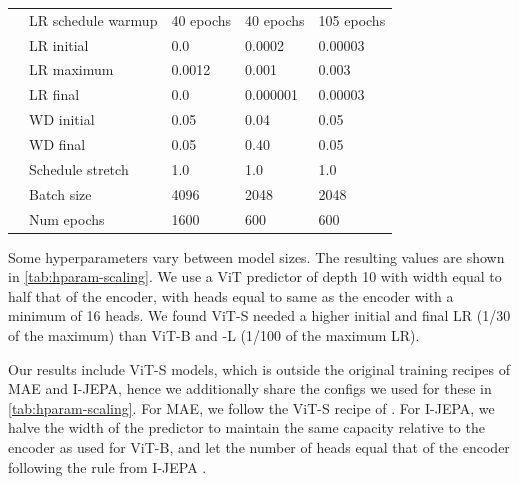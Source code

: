 \begin{table}[tbh]
{\begin{tabular}{@{}lllll@{}}
          & LR schedule warmup& 40 epochs                      & 40 epochs                       & 105 epochs                    \\
          & LR initial        & 0.0                            & 0.0002                          & 0.00003                       \\
          & LR maximum        & {0.0012}                       & {0.001}                         & {0.003}                       \\
          & LR final          & 0.0                            & 0.000001                        & 0.00003                       \\
          & WD initial        & 0.05                           & 0.04                            & 0.05                          \\
          & WD final          & {0.05}                         & {0.40}                          & {0.05}                        \\
          & Schedule stretch  & 1.0                            & 1.0                             & 1.0                           \\
          & Batch size        & 4096                           & 2048                            & 2048                          \\
          & {Num epochs}      & 1600                           & 600                             & 600                           \\
\bottomrule
\end{tabular}
}
\end{table}

Some hyperparameters vary between model sizes.
The resulting values are shown in \cref{tab:hparam-scaling}.
We use a ViT predictor of depth 10 with width equal to half that of the encoder, with heads equal to same as the encoder with a minimum of 16 heads.
We found ViT-S needed a higher initial and final LR (1/30 of the maximum) than ViT-B and -L (1/100 of the maximum LR).

Our results include ViT-S models, which is outside the original training recipes of MAE and I-JEPA, hence we additionally share the configs we used for these in \cref{tab:hparam-scaling}.
For MAE, we follow the ViT-S recipe of \citep{fu2025crossmae}.
For I-JEPA, we halve the width of the predictor to maintain the same capacity relative to the encoder as used for ViT-B, and let the number of heads equal that of the encoder following the rule from I-JEPA \citep{assran2023ijepa}.

